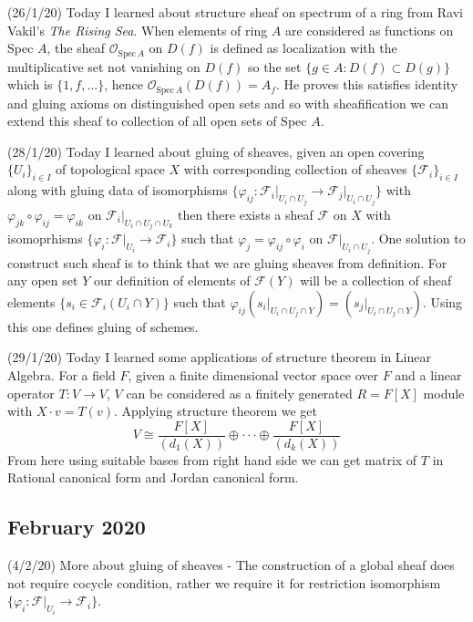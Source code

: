 \documentclass[12pt,a4paper]{article}
\begin{document}
(26/1/20) Today I learned about structure sheaf on spectrum of a ring from Ravi Vakil's \textit{The Rising Sea}. When elements of ring $A$ are considered as functions on Spec $A$, the sheaf $\mathcal{O}_{\text{Spec} \, A}$ on $D(f)$ is defined as localization with the multiplicative set not vanishing on $D(f)$ so the set $\{ g\in A : D(f) \subset D(g)\}$ which is $\{1,f,...\}$, hence $\mathcal{O}_{\text{Spec} \, A}(D(f))=A_f$. He proves this satisfies identity and gluing axioms on distinguished open sets and so with sheafification we can extend this sheaf to collection of all open sets of Spec $A$.

(28/1/20) Today I learned about gluing of sheaves, given an open covering $\{U_i\}_{i\in I}$ of topological space $X$ with corresponding collection of sheaves $\{\mathcal{F}_i\}_{i \in I}$ along with gluing data of isomorphisms $\{\varphi_{ij} : \mathcal{F}_i\vert_{U_i \cap U_j} \to \mathcal{F}_j\vert_{U_i \cap U_j} \}$ with $\varphi_{jk} \circ \varphi_{ij} = \varphi_{ik}$ on $\mathcal{F}_i\vert_{U_i \cap U_j \cap U_k}$ then there exists a sheaf $\mathcal{F}$ on $X$ with isomoprhisms $\{\varphi_i :  \mathcal{F}\vert_{U_i} \to \mathcal{F}_i\}$ such that $\varphi_j = \varphi_{ij} \circ \varphi_i$ on $\mathcal{F}\vert_{U_i \cap U_j}$. One solution to construct such sheaf is to think that we are gluing sheaves from definition. For any open set $Y$ our definition of elements of $\mathcal{F}(Y)$ will be a collection of sheaf elements $\{s_i \in \mathcal{F}_i(U_i\cap Y)\}$ such that $\varphi_{ij} (s_i\vert_{U_i\cap U_j \cap Y})= (s_j\vert_{U_i\cap U_j \cap Y})$. Using this one defines gluing of schemes.

(29/1/20) Today I learned some applications of structure theorem in Linear Algebra. For a field $F$, given a finite dimensional vector space over $F$ and a linear operator $T : V \to V$, $V$ can be considered as a finitely generated $R=F[X]$ module with $X\cdot v=T(v)$. Applying structure theorem we get \[ V \cong \frac{F[X]}{(d_1(X))} \oplus \cdot \cdot\cdot \oplus \frac{F[X]}{(d_k(X))} \] From here using suitable bases from right hand side we can get matrix of $T$ in Rational canonical form and Jordan canonical form.

\subsection*{February 2020}

\quad (4/2/20) More about gluing of sheaves - The construction of a global sheaf does not require cocycle condition, rather we require it for restriction isomorphism $\{\varphi_i :  \mathcal{F}\vert_{U_i} \to \mathcal{F}_i\}$.
\end{document}
